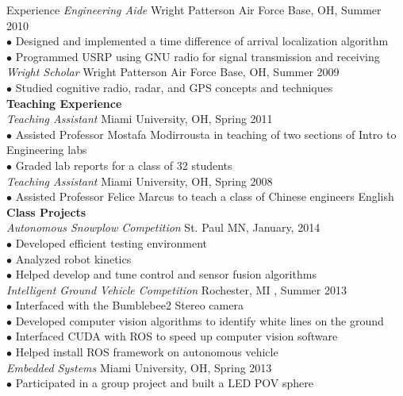 \documentclass{resume} %
\begin{document}
\begin{rSection}{Experience}
  \textit{Engineering Aide} \hfill Wright Patterson Air Force Base, OH, Summer 2010 \\ [1 mm]
  $\bullet$ Designed and implemented a time difference of arrival localization algorithm \\
  $\bullet$ Programmed USRP using GNU radio for signal transmission and receiving \\[3 mm]
  \textit{Wright Scholar} \hfill Wright Patterson Air Force Base, OH, Summer 2009 \\ [1 mm]
  $\bullet$ Studied cognitive radio, radar, and GPS concepts and techniques \\[3 mm]
  \textbf{Teaching Experience}\\[1 mm]
  \textit{Teaching Assistant} \hfill Miami University, OH, Spring 2011 \\ [1 mm]
  $\bullet$ Assisted Professor Mostafa Modirrousta in teaching of two sections of Intro to Engineering labs\\
  $\bullet$ Graded lab reports for a class of 32 students \\ [3 mm]
  \textit{Teaching Assistant} \hfill Miami University, OH, Spring 2008 \\ [1 mm]
  $\bullet$ Assisted Professor Felice Marcus to teach a class of Chinese engineers English \\[3 mm]
  \textbf{Class Projects}\\[1 mm]
  \textit{Autonomous Snowplow Competition} \hfill St. Paul MN, January, 2014 \\ [1 mm]
  $\bullet$ Developed efficient testing environment\\
  $\bullet$ Analyzed robot kinetics \\
  $\bullet$ Helped develop and tune control and sensor fusion algorithms \\[1 mm]
  \textit{Intelligent Ground Vehicle Competition} \hfill Rochester, MI , Summer 2013 \\ [1 mm]
  $\bullet$ Interfaced with the Bumblebee2 Stereo camera \\
  $\bullet$ Developed computer vision algorithms to identify white lines on the ground \\
  $\bullet$ Interfaced CUDA with ROS to speed up computer vision software \\
  $\bullet$ Helped install ROS framework on autonomous vehicle \\[1 mm]
  \textit{Embedded Systems} \hfill Miami University, OH, Spring 2013\\
  $\bullet$ Participated in a group project and built a LED POV sphere\\[1 mm]

\end{rSection}
\end{document}
